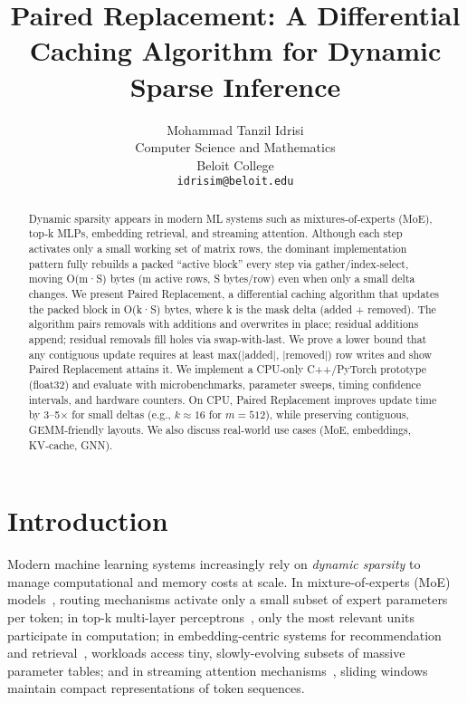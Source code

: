 \documentclass{article}
\title{Paired Replacement: A Differential Caching Algorithm for Dynamic Sparse Inference}
\author{ 
	{\hspace{1mm}Mohammad Tanzil Idrisi} \\
	Computer Science and Mathematics\\
	Beloit College\\
	\texttt{idrisim@beloit.edu} \\
}
\numberwithin{equation}{section}
\theoremstyle{plain}
\theoremstyle{definition}
\theoremstyle{remark}
\begin{document}
\maketitle
 
\begin{abstract}
Dynamic sparsity appears in modern ML systems such as mixtures‑of‑experts (MoE), top‑k MLPs, embedding retrieval, and streaming attention. Although each step activates only a small working set of matrix rows, the dominant implementation pattern fully rebuilds a packed “active block” every step via gather/index‑select, moving O(m·S) bytes (m active rows, S bytes/row) even when only a small delta changes. We present Paired Replacement, a differential caching algorithm that updates the packed block in O(k·S) bytes, where k is the mask delta (added + removed). The algorithm pairs removals with additions and overwrites in place; residual additions append; residual removals fill holes via swap‑with‑last. We prove a lower bound that any contiguous update requires at least max(|added|, |removed|) row writes and show Paired Replacement attains it. We implement a CPU‑only C++/PyTorch prototype (float32) and evaluate with microbenchmarks, parameter sweeps, timing confidence intervals, and hardware counters. On CPU, Paired Replacement improves update time by 3–5× for small deltas (e.g., $k\approx16$ for $m=512$), while preserving contiguous, GEMM‑friendly layouts. We also discuss real‑world use cases (MoE, embeddings, KV‑cache, GNN).
\end{abstract}





\section{Introduction}

Modern machine learning systems increasingly rely on \emph{dynamic sparsity} to manage computational and memory costs at scale. In mixture-of-experts (MoE) models~\cite{shazeer2017outrageously, fedus2022switch}, routing mechanisms activate only a small subset of expert parameters per token; in top-k multi-layer perceptrons~\cite{zoph2022designing}, only the most relevant units participate in computation; in embedding-centric systems for recommendation and retrieval~\cite{kang2020deep}, workloads access tiny, slowly-evolving subsets of massive parameter tables; and in streaming attention mechanisms~\cite{dao2022flashattention}, sliding windows maintain compact representations of token sequences.
\end{document}
